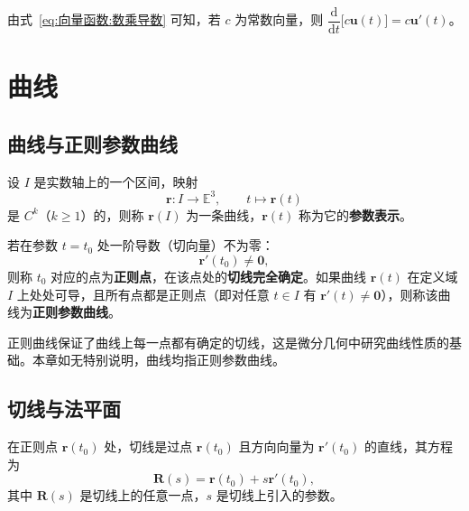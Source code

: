 \begin{remark}
	由式~\eqref{eq:向量函数:数乘导数} 可知，若 $c$ 为常数向量，则
	$\dfrac{\mathrm{d}}{\mathrm{d}t}\bigl[c\boldsymbol{u}(t)\bigr]=c\boldsymbol{u}'(t)$。
\end{remark}

\section{曲线}

\subsection{曲线与正则参数曲线}

\begin{definition}[曲线]
	设 $I$ 是实数轴上的一个区间，映射
	\begin{equation}
		\boldsymbol{r}:I\longrightarrow\mathbb{E}^3,\qquad t\longmapsto\boldsymbol{r}(t)
		\label{eq:曲线:定义}
	\end{equation}
	是 $C^k$（$k\geqslant1$）的，则称 $\boldsymbol{r}(I)$ 为一条曲线，$\boldsymbol{r}(t)$ 称为它的\textbf{参数表示}。
\end{definition}

\begin{definition}[正则点与正则参数曲线]
	若在参数 $t=t_0$ 处一阶导数（切向量）不为零：
	\begin{equation}
		\boldsymbol{r}'(t_0)\neq\boldsymbol{0},
		\label{eq:正则点:条件}
	\end{equation}
	则称 $t_0$ 对应的点为\textbf{正则点}，在该点处的\textbf{切线完全确定}。如果曲线 $\boldsymbol{r}(t)$ 在定义域 $I$ 上处处可导，且所有点都是正则点（即对任意 $t\in I$ 有 $\boldsymbol{r}'(t)\neq\boldsymbol{0}$），则称该曲线为\textbf{正则参数曲线}。
\end{definition}

\begin{remark}
	正则曲线保证了曲线上每一点都有确定的切线，这是微分几何中研究曲线性质的基础。本章如无特别说明，曲线均指正则参数曲线。
\end{remark}

\subsection{切线与法平面}

\begin{proposition}[切线方程]
	在正则点 $\boldsymbol{r}(t_0)$ 处，切线是过点 $\boldsymbol{r}(t_0)$ 且方向向量为 $\boldsymbol{r}'(t_0)$ 的直线，其方程为
	\begin{equation}
		\boldsymbol{R}(s)=\boldsymbol{r}(t_0)+s\boldsymbol{r}'(t_0),
		\label{eq:切线:参数方程}
	\end{equation}
	其中 $\boldsymbol{R}(s)$ 是切线上的任意一点，$s$ 是切线上引入的参数。
\end{proposition}

